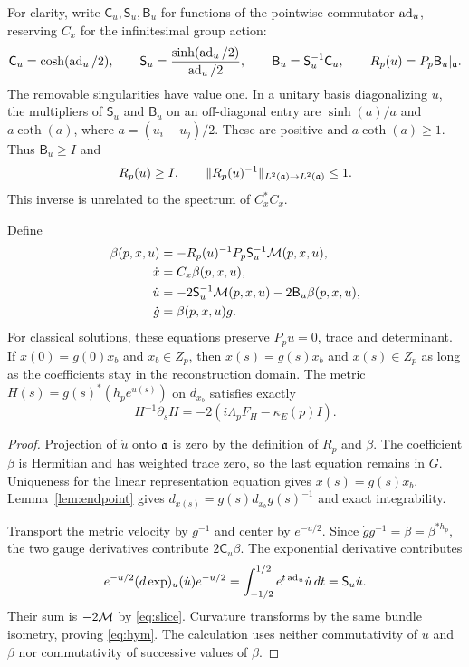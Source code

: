 For clarity, write $\mathsf C_u,\mathsf S_u,\mathsf B_u$ for
functions of the pointwise commutator $\operatorname{ad}_u$, reserving $C_x$
for the infinitesimal group action:
\begin{equation}\label{eq:exponential-functions}
 \mathsf C_u=\cosh(\operatorname{ad}_u/2),\qquad
 \mathsf S_u=\frac{\sinh(\operatorname{ad}_u/2)}{\operatorname{ad}_u/2},\qquad
 \mathsf B_u=\mathsf S_u^{-1}\mathsf C_u,\qquad
 R_p(u)=P_p\mathsf B_u|_{\mathfrak a}.
\end{equation}
The removable singularities have value one. In a unitary basis
diagonalizing $u$, the multipliers of $\mathsf S_u$ and
$\mathsf B_u$ on an off-diagonal entry are $\sinh(a)/a$ and
$a\coth(a)$, where $a=(u_i-u_j)/2$. These are positive and
$a\coth(a)\ge1$. Thus $\mathsf B_u\ge I$ and
\begin{equation}\label{eq:R-inverse}
 R_p(u)\ge I,\qquad \|R_p(u)^{-1}\|_{L^2(\mathfrak a)\to L^2(\mathfrak a)}\le1.
\end{equation}
This inverse is unrelated to the spectrum of $C_x^*C_x$.

\begin{proposition}\label{prop:slice}
Define
\begin{equation}\label{eq:slice}
 \begin{split}
 \beta(p,x,u)&=-R_p(u)^{-1}P_p\mathsf S_u^{-1}\mathcal M(p,x,u),\\
 \dot x&=C_x\beta(p,x,u),\\
 \dot u&=-2\mathsf S_u^{-1}\mathcal M(p,x,u)-2\mathsf B_u\beta(p,x,u),\\
 \dot g&=\beta(p,x,u)g.
 \end{split}
\end{equation}
For classical solutions, these equations preserve $P_pu=0$,
trace and determinant. If $x(0)=g(0)x_b$ and $x_b\in Z_p$,
then $x(s)=g(s)x_b$ and $x(s)\in Z_p$ as long as the
coefficients stay in the reconstruction domain. The metric
$H(s)=g(s)^*(h_pe^{u(s)})$ on $d_{x_b}$ satisfies exactly
\begin{equation}\label{eq:hym}
 H^{-1}\partial_sH=-2(i\Lambda_pF_H-\kappa_E(p)I).
\end{equation}
\end{proposition}

\begin{proof}
Projection of $\dot u$ onto $\mathfrak a$ is zero by the definition of
$R_p$ and $\beta$. The coefficient $\beta$ is Hermitian and has
weighted trace zero, so the last equation remains in $G$.
Uniqueness for the linear representation equation gives
$x(s)=g(s)x_b$. Lemma~\ref{lem:endpoint} gives
$d_{x(s)}=g(s)d_{x_b}g(s)^{-1}$ and exact integrability.

Transport the metric velocity by $g^{-1}$ and center by
$e^{-u/2}$. Since $\dot gg^{-1}=\beta=\beta^{*h_p}$, the two
gauge derivatives contribute $2\mathsf C_u\beta$. The exponential
derivative contributes
\[
 e^{-u/2}(d\exp)_u(\dot u)e^{-u/2}
   =\int_{-1/2}^{1/2}e^{t\operatorname{ad}_u}\dot u\,dt
   =\mathsf S_u\dot u.
\]
Their sum is $-2\mathcal M$ by \eqref{eq:slice}. Curvature transforms by
the same bundle isometry, proving \eqref{eq:hym}.
The calculation uses neither commutativity of $u$ and $\beta$
nor commutativity of successive values of $\beta$.
\end{proof}

